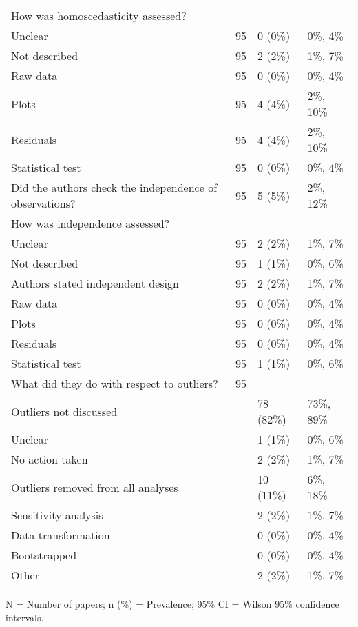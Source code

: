 \begin{table}[H]
\begin{widestuff}
\begin{flushleft}
\begin{tabular}{p{9cm}lll}
  How was homoscedasticity assessed? &  &  &  \\ 
  Unclear & 95 & 0 (0\%) & 0\%, 4\% \\ 
  Not described & 95 & 2 (2\%) & 1\%, 7\% \\ 
  Raw data & 95 & 0 (0\%) & 0\%, 4\% \\ 
  Plots & 95 & 4 (4\%) & 2\%, 10\% \\ 
  Residuals & 95 & 4 (4\%) & 2\%, 10\% \\ 
  Statistical test & 95 & 0 (0\%) & 0\%, 4\% \\ 
  Did the authors check the independence of observations? & 95 & 5 (5\%) & 2\%, 12\% \\ 
  How was independence assessed? &  &  &  \\ 
  Unclear & 95 & 2 (2\%) & 1\%, 7\% \\ 
  Not described & 95 & 1 (1\%) & 0\%, 6\% \\ 
  Authors stated independent design & 95 & 2 (2\%) & 1\%, 7\% \\ 
  Raw data & 95 & 0 (0\%) & 0\%, 4\% \\ 
  Plots & 95 & 0 (0\%) & 0\%, 4\% \\ 
  Residuals & 95 & 0 (0\%) & 0\%, 4\% \\ 
  Statistical test & 95 & 1 (1\%) & 0\%, 6\% \\ 
  What did they do with respect to outliers? & 95 &  &  \\ 
  Outliers not discussed &  & 78 (82\%) & 73\%, 89\% \\ 
  Unclear &  & 1 (1\%) &  0\%,  6\% \\ 
  No action taken &  & 2 (2\%) &  1\%,  7\% \\ 
  Outliers removed from all analyses &  & 10 (11\%) &  6\%, 18\% \\ 
  Sensitivity analysis &  & 2 (2\%) &  1\%,  7\% \\ 
  Data transformation &  & 0 (0\%) &  0\%,  4\% \\ 
  Bootstrapped &  & 0 (0\%) &  0\%,  4\% \\ 
  Other &  & 2 (2\%) &  1\%,  7\% \\ 
   \bottomrule
\end{tabular} \end{flushleft} \begin{flushleft} N = Number of papers; n (\%) = Prevalence;  95\% CI  =	Wilson 95\% confidence intervals. \end{flushleft}
\end{widestuff}
\end{table}

